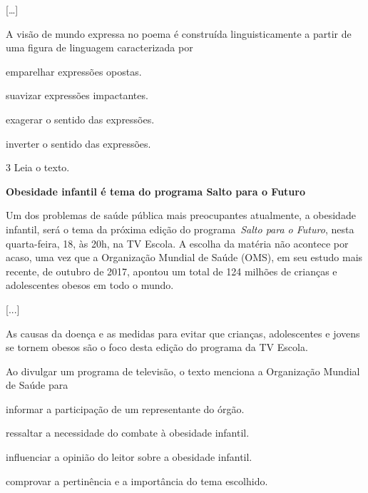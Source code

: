 \begin{myquote}
{[}\ldots{]}
\end{myquote}


A visão de mundo expressa no poema é construída linguisticamente a
partir de uma figura de linguagem caracterizada por

\begin{escolha}
\item emparelhar expressões opostas.

\item suavizar expressões impactantes.

\item exagerar o sentido das expressões.

\item inverter o sentido das expressões.
\end{escolha}

\num{3} Leia o texto.

\begin{myquote}
\centering\textbf{Obesidade infantil é tema do programa Salto para o Futuro}


Um dos problemas de saúde pública mais preocupantes atualmente, a
obesidade infantil, será o tema da próxima edição do
programa~\emph{Salto para o Futuro}, nesta quarta-feira, 18, às 20h, na
TV Escola. A escolha da matéria não acontece por acaso, uma vez que a
Organização Mundial de Saúde (OMS), em seu estudo mais recente, de
outubro de 2017, apontou um total de 124 milhões de crianças e
adolescentes obesos em todo o mundo.

{[}...{]}

As causas da doença e as medidas para evitar que crianças, adolescentes
e jovens se tornem obesos são o foco desta edição do programa da TV
Escola.
\end{myquote}


Ao divulgar um programa de televisão, o texto menciona a Organização
Mundial de Saúde para

\begin{escolha}
\item informar a participação de um representante do órgão.

\item ressaltar a necessidade do combate à obesidade infantil.

\item influenciar a opinião do leitor sobre a obesidade infantil.

\item comprovar a pertinência e a importância do tema escolhido.
\end{escolha}

